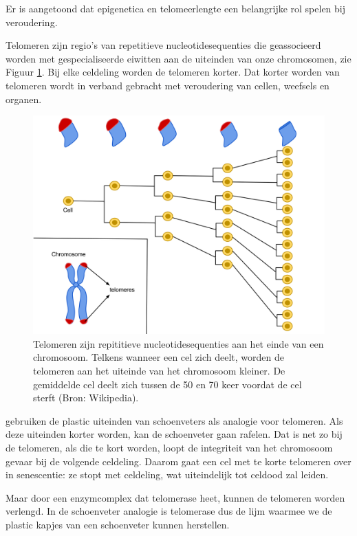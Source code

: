 \documentclass[
  11pt,
]{book}
\begin{document}
Er is aangetoond dat epigenetica en telomeerlengte een belangrijke rol spelen bij veroudering.

Telomeren zijn regio's van repetitieve nucleotidesequenties die geassocieerd worden met gespecialiseerde eiwitten aan de uiteinden van onze chromosomen, zie Figuur \ref{fig:telomeres}. Bij elke celdeling worden de telomeren korter. Dat korter worden van telomeren wordt in verband gebracht met veroudering van cellen, weefsels en organen.

\begin{figure}

{\centering \includegraphics[width=0.8\linewidth]{./figs/telomeres} 

}

\caption{Telomeren zijn repititieve nucleotidesequenties aan het einde van een chromosoom. Telkens wanneer een cel zich deelt, worden de telomeren aan het uiteinde van het chromosoom kleiner. De gemiddelde cel deelt zich tussen de 50 en 70 keer voordat de cel sterft (Bron: Wikipedia).}\label{fig:telomeres}
\end{figure}

\citet{BlackburnEpel2017} gebruiken de plastic uiteinden van schoenveters als analogie voor telomeren. Als deze uiteinden korter worden, kan de schoenveter gaan rafelen. Dat is net zo bij de telomeren, als die te kort worden, loopt de integriteit van het chromosoom gevaar bij de volgende celdeling. Daarom gaat een cel met te korte telomeren over in senescentie: ze stopt met celdeling, wat uiteindelijk tot celdood zal leiden.

Maar door een enzymcomplex dat telomerase heet, kunnen de telomeren worden verlengd. In de schoenveter analogie is telomerase dus de lijm waarmee we de plastic kapjes van een schoenveter kunnen herstellen.
\end{document}
